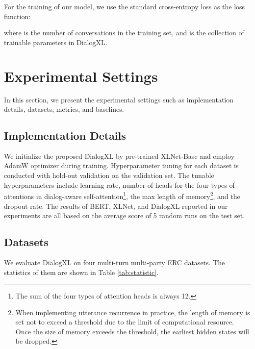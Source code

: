 \documentclass[letterpaper]{article} \usepackage{aaai21}  \usepackage{times}  \usepackage{helvet} \usepackage{courier}  \usepackage[hyphens]{url}  \usepackage{graphicx} \usepackage{amstext}
\begin{document}
For the training of our model, we use the standard cross-entropy loss as the loss function:

where  is the number of conversations in the training set, and  is the collection of trainable parameters in DialogXL.

\section{Experimental Settings}

In this section, we present the experimental settings such as implementation details, datasets, metrics, and baselines.

\subsection{Implementation Details}
We initialize the proposed DialogXL by pre-trained XLNet-Base \cite{yang2019xlnet} and employ AdamW optimizer \cite{loshchilov2018fixing} during training. Hyperparameter tuning for each dataset is conducted  with hold-out validation on the validation set. The tunable hyperparameters include learning rate, number of heads for the four types of attentions in dialog-aware self-attention\footnote{The sum of the four types of attention heads is always 12.}, the max length of memory\footnote{When implementing utterance recurrence in practice, the length of memory is set not to exceed a threshold due to the limit of computational resource. Once the size of memory exceeds the threshold, the earliest hidden states will be dropped. }, and the dropout rate. The results of BERT, XLNet, and DialogXL reported in our experiments are all based on the average score of 5 random runs on the test set.


\subsection{Datasets}
We evaluate DialogXL on four multi-turn multi-party ERC datasets. The statistics of them are shown in Table \ref{tab:statistic}.
\begin{table}[t]
	\centering
	\caption{The statistics of four datasets.}
	\label{tab:statistic}
\end{table}
\end{document}
